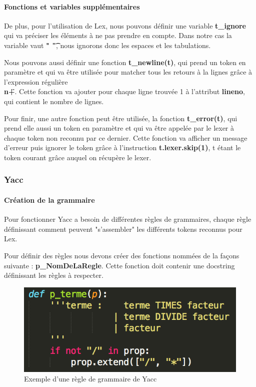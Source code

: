 \documentclass[a4paper,12pt]{article}
\begin{document}
			\paragraph{Fonctions et variables supplémentaires\\}

				De plus, pour l'utilisation de Lex, nous pouvons définir une variable \textbf{t\_ignore} qui va préciser les éléments à ne pas prendre en compte. Dans notre cas la variable vaut \textbf{" \t"}, nous ignorons donc les espaces et les tabulations.

				Nous pouvons aussi définir une fonction \textbf{t\_newline(t)}, qui prend un token en paramètre et qui va être utilisée pour matcher tous les retours à la lignes grâce à l'expression régulière \textbf{\"\\n+\"}. Cette fonction va ajouter pour chaque ligne trouvée 1 à l'attribut \textbf{lineno}, qui contient le nombre de lignes.

				Pour finir, une autre fonction peut être utilisée, la fonction \textbf{t\_error(t)}, qui prend elle aussi un token en paramètre et qui va être appelée par le lexer à chaque token non reconnu par ce dernier. Cette fonction va afficher un message d'erreur puis ignorer le token grâce à l'instruction \textbf{t.lexer.skip(1)}, t étant le token courant grâce auquel on récupère le lexer. 

		\subsubsection{Yacc}

			\paragraph{Création de la grammaire}

				Pour fonctionner Yacc a besoin de différentes règles de grammaires, chaque règle définissant comment peuvent "s'assembler" les différents tokens reconnus pour Lex.

				Pour définir des règles nous devons créer des fonctions nommées de la façons suivante : \textbf{p\_NomDeLaRegle}. Cette fonction doit contenir une docstring définissant les règles à respecter.

				\begin{figure}[h!]
					\begin{center}
						\includegraphics[scale=1]{images/exp_grammaire_yacc}
						\caption{Exemple d'une règle de grammaire de Yacc}
					\end{center}
				\end{figure}
\end{document}
